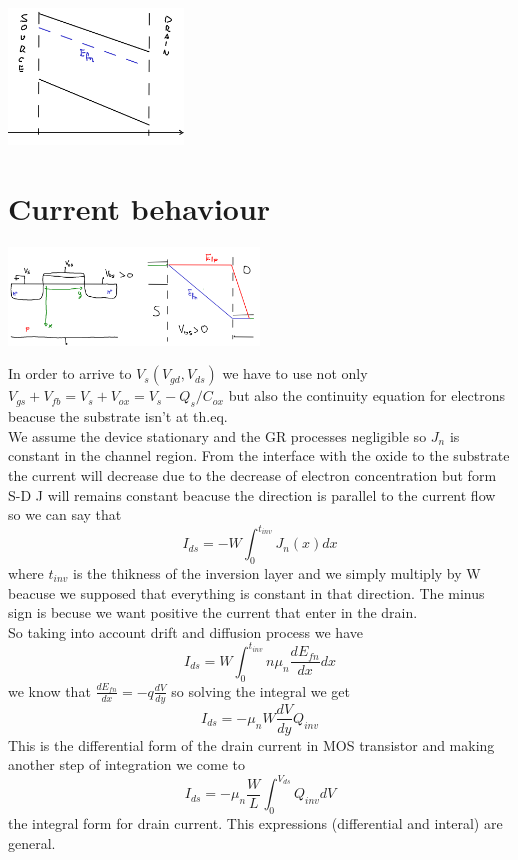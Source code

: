 \centering
\includegraphics[width=0.35\textwidth]{a1.png}\\
\raggedright


\section{Current behaviour}


\centering
\includegraphics[width=0.5\textwidth]{a2.png}\\
\raggedright


In order to arrive to $V_s(V_{gd},V_{ds})$ we have to use not only $V_{gs}+V_{fb}=V_{s}+V_{ox}=V_{s}-Q_s/C_{ox}$ but also the continuity equation for electrons beacuse the substrate isn't at th.eq.\\
We assume the device stationary and the GR processes negligible so $J_n$ is constant in the channel region. From the interface with the oxide to the substrate the current will decrease due to the decrease of electron concentration but form S-D J will remains constant beacuse the direction is parallel to the current flow so we can say that
\begin{equation}
I_{ds}=-W\int^{t_{inv}}_0 J_n(x)dx
\end{equation}
where $t_{inv}$ is the thikness of the inversion layer and we simply multiply by W beacuse we supposed that everything is constant in that direction. The minus sign is becuse we want positive the current that enter in the drain.\\
So taking into account drift and diffusion process we have 
\begin{equation}
I_{ds}=W\int^{t_{inv}}_0 n\mu_n \frac{dE_{fn}}{dx} dx
\end{equation}
we know that $\frac{dE_{fn}}{dx}=-q \frac{dV}{dy}$ so solving the integral we get
\begin{equation}
I_{ds}=-\mu_nW \frac{dV}{dy}Q_{inv}
\end{equation}
This is the differential form of the drain current in MOS transistor and making another step of integration we come to 
\begin{equation}
I_{ds}=-\mu_n\frac{W}{L}\int^{V_{ds}}_0Q_{inv}dV
\end{equation}
the integral form for drain current. This expressions (differential and interal) are general.\\
\vspace{5mm}

